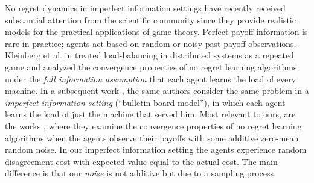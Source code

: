 No regret dynamics in imperfect information settings have recently received
substantial attention from the scientific community since they provide
realistic models for the practical applications of game theory.  Perfect payoff
information is rare in practice; agents act based on random or noisy past
payoff observations.  Kleinberg et al. in \cite{KPT09} treated load-balancing
in distributed systems as a repeated game and analyzed the convergence
properties of no regret learning algorithms under the \emph{full information
  assumption} that each agent learns the load of every machine.  In a
subsequent work \cite{KPT11}, the same authors consider the same problem in a
\emph{imperfect information setting} (\enquote{bulletin board model}), in which
each agent learns the load of just the machine that served him. Most relevant
to ours, are the works \cite{HCM17,MS17,BM17,CHM17}, where they examine the
convergence properties of no regret learning algorithms when the agents observe
their payoffs with some additive zero-mean random noise. In our imperfect
information setting the agents experience random disagreement cost with
expected value equal to the actual cost.  The main difference is that our
\emph{noise} is not additive but due to a sampling process.
